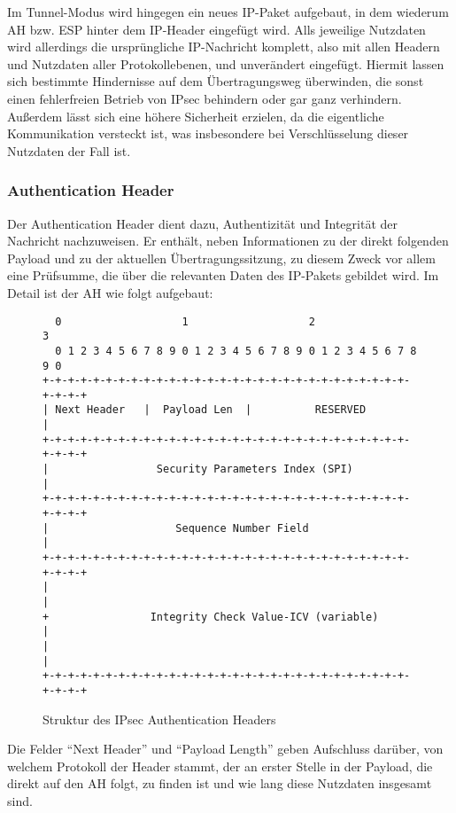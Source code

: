 Im Tunnel-Modus wird hingegen ein neues IP-Paket aufgebaut, in dem wiederum AH bzw. ESP hinter dem IP-Header eingefügt wird. Alls jeweilige Nutzdaten wird allerdings die ursprüngliche IP-Nachricht komplett, also mit allen Headern und Nutzdaten aller Protokollebenen, und unverändert eingefügt. Hiermit lassen sich bestimmte Hindernisse auf dem Übertragungsweg überwinden, die sonst einen fehlerfreien Betrieb von IPsec behindern oder gar ganz verhindern. Außerdem lässt sich eine höhere Sicherheit erzielen, da die eigentliche Kommunikation versteckt ist, was insbesondere bei Verschlüsselung dieser Nutzdaten der Fall ist.

\subsubsection{Authentication Header}
Der Authentication Header dient dazu, Authentizität und Integrität der Nachricht nachzuweisen. Er enthält, neben Informationen zu der direkt folgenden Payload und zu der aktuellen Übertragungssitzung, zu diesem Zweck vor allem eine Prüfsumme, die über die relevanten Daten des IP-Pakets gebildet wird. Im Detail ist der AH wie folgt aufgebaut:

\begin{figure}[!h]
	\small
    \begin{verbatim}
  0                   1                   2                   3
  0 1 2 3 4 5 6 7 8 9 0 1 2 3 4 5 6 7 8 9 0 1 2 3 4 5 6 7 8 9 0
+-+-+-+-+-+-+-+-+-+-+-+-+-+-+-+-+-+-+-+-+-+-+-+-+-+-+-+-+-+-+-+-+
| Next Header   |  Payload Len  |          RESERVED             |
+-+-+-+-+-+-+-+-+-+-+-+-+-+-+-+-+-+-+-+-+-+-+-+-+-+-+-+-+-+-+-+-+
|                 Security Parameters Index (SPI)               |
+-+-+-+-+-+-+-+-+-+-+-+-+-+-+-+-+-+-+-+-+-+-+-+-+-+-+-+-+-+-+-+-+
|                    Sequence Number Field                      |
+-+-+-+-+-+-+-+-+-+-+-+-+-+-+-+-+-+-+-+-+-+-+-+-+-+-+-+-+-+-+-+-+
|                                                               |
+                Integrity Check Value-ICV (variable)           |
|                                                               |
+-+-+-+-+-+-+-+-+-+-+-+-+-+-+-+-+-+-+-+-+-+-+-+-+-+-+-+-+-+-+-+-+
	\end{verbatim}
    \caption{Struktur des IPsec Authentication Headers}
\end{figure}

Die Felder “Next Header” und “Payload Length” geben Aufschluss da\-rü\-ber, von welchem Protokoll der Header stammt, der an erster Stelle in der Payload, die direkt auf den AH folgt, zu finden ist und wie lang diese Nutzdaten insgesamt sind.

